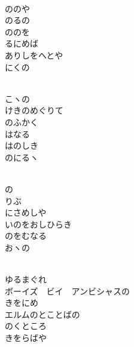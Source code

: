 \documentclass[10pt,b5j]{tarticle} %
\begin{document}
\begin{enumerate}
\begin{minipage}[c]{\blocksize}
        \vspace{\linespace}
        \item~\\
        ののや\\
        のるの\\
        ののを\\
        るにめば\\
        ありしをへとや\\
        にくの
        
        \vspace{\linespace}
        \item~\\
        こヽの\\
        けきのめぐりて\\
        のふかく\\
        はなる\\
        はのしき\\
        のにるヽ
        
        \vspace{\linespace}
        \item~\\
        の\\
        りぶ\\
        にさめしや\\
        いのをおしひらき\\
        のをむなる\\
        おヽの
        
        \vspace{\linespace}
        \item~\\
        ゆるまぐれ\\
        ボーイズ　ビイ　アンビシャスの\\
        きをにめ\\
        エルムのとことばの\\
        のくところ\\
        きをらばや
    
    \end{minipage}
\end{enumerate} %
\end{document}
